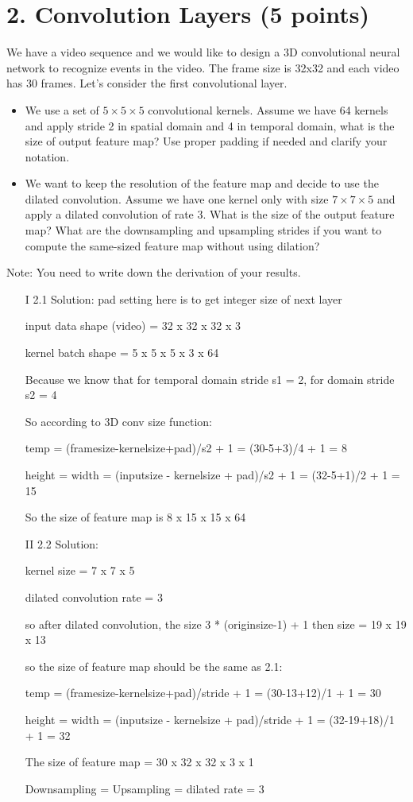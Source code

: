 \documentclass[12pt]{article}%
\begin{document}
\section*{2. Convolution Layers (5 points)}
We have a video sequence and we would like to design a 3D convolutional neural network to recognize events in the video. The frame size is 32x32 and each video has 30 frames. Let's consider the first convolutional layer.  
\begin{itemize}
	\item We use a set of $5\times 5\times 5$ convolutional kernels. Assume we have 64 kernels and apply stride 2 in spatial domain and 4 in temporal domain, what is the size of output feature map? Use proper padding if needed and clarify your notation.
	\item We want to keep the resolution of the feature map and decide to use the dilated convolution. Assume we have one kernel only with size $7\times 7\times 5$ and apply a dilated convolution of rate $3$. What is the size of the output feature map? What are the downsampling and upsampling strides if you want to compute the same-sized feature map without using dilation?   
\end{itemize}
Note: You need to write down the derivation of your results.
\begin{itemize}

\item[I] 2.1 Solution:
pad setting here is to get integer size of next layer

input data shape (video) = 32 x 32 x 32 x 3

kernel batch shape = 5 x 5 x 5 x 3 x 64

Because we know that for temporal domain stride s1 = 2, for domain stride s2 = 4

So according to 3D conv size function:

temp = (framesize-kernelsize+pad)/s2 + 1 = (30-5+3)/4 + 1 = 8

height = width = (inputsize - kernelsize + pad)/s2 + 1 = (32-5+1)/2 + 1 = 15

So the size of feature map is 8 x 15 x 15 x 64

\item[II] 2.2 Solution:

kernel size = 7 x 7 x 5

dilated convolution rate = 3

so after dilated convolution, the size 3 * (originsize-1) + 1 then size = 19 x 19 x 13

so the size of feature map should be the same as 2.1:

temp = (framesize-kernelsize+pad)/stride + 1 = (30-13+12)/1 + 1 = 30

height = width = (inputsize - kernelsize + pad)/stride + 1 = (32-19+18)/1 + 1 = 32

The size of feature map = 30 x 32 x 32 x 3 x 1

Downsampling = Upsampling = dilated rate = 3
\end{itemize}
\end{document}
